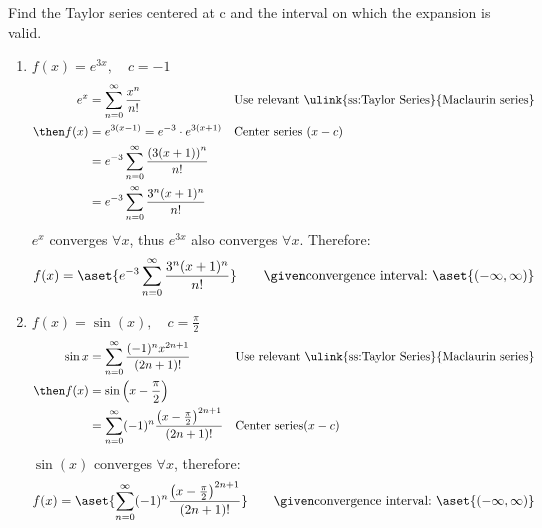 Find the Taylor series centered at c and the interval on which the expansion is
valid.
\begin{enumerate}[itemsep=18em, resume]
  \item \(\displaystyle  f(x) = e^{3x}, \quad c = -1 \)
    \begin{align*}
      e^x &= \sum_{n=0}^{\infty} \frac{x^n}{n!}
      && \text{Use relevant \ulink{ss:Taylor Series}{Maclaurin series}} \\
      \then
      f(x) &= e^{3(x-1)} = e^{-3} \cdot e^{3(x+1)}
      && \text{Center series \((x-c\))} \\
      &= e^{-3} \sum_{n=0}^{\infty} \frac{\left(3(x+1)\right)^n}{n!} \\
      &= e^{-3} \sum_{n=0}^{\infty} \frac{3^n(x+1)^n}{n!}
    \end{align*}
    \(e^x\) converges \(\forall x\), thus \(e^{3x} \) also converges \(\forall x\).
    Therefore:
    \[%
      f(x) = \aset{e^{-3} \sum_{n=0}^{\infty} \frac{3^n(x+1)^n}{n!}}
      \qquad \given \text{convergence interval:}~\aset{(-\infty, \infty)}
    \]%

  \vspace{-12em}
  \item \(\displaystyle  f(x) = \sin(x), \quad c = \frac{\pi}{2} \)
    \begin{align*}
      \sin x &= \sum_{n=0}^{\infty} \frac{(-1)^nx^{2n+1} }{(2n+1)!}
      && \text{Use relevant \ulink{ss:Taylor Series}{Maclaurin series}} \\
      \then f(x) &= \sin\left(x-\frac{\pi}{2}\right) \\
      &= \sum_{n=0}^{\infty} (-1)^n \frac{\left( x - \frac{\pi}{2}\right)^{2n+1} }{(2n+1)!}
      && \text{Center series} (x-c)
    \end{align*}
    \(\sin(x)\) converges \(\forall x\), therefore:
    \[%
      f(x)
      = \aset{\sum_{n=0}^{\infty} (-1)^n \frac{\left( x-\frac{\pi}{2} \right) ^{2n+1} }{(2n+1)!}}
      \qquad \given \text{convergence interval:}~\aset{(-\infty, \infty)}
    \]%
\end{enumerate}


